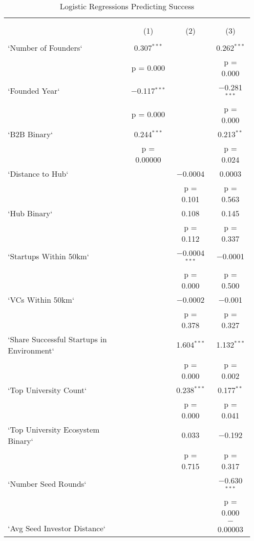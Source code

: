 
\begin{table}[!htbp] \centering 
  \caption{Logistic Regressions Predicting Success} 
  \label{} 
\tiny 
\begin{tabular}{@{\extracolsep{0pt}}lccc} 
\\[-1.8ex]\hline 
\hline \\[-1.8ex] 
\\[-1.8ex] & (1) & (2) & (3)\\ 
\hline \\[-1.8ex] 
 `Number of Founders` & 0.307$^{***}$ &  & 0.262$^{***}$ \\ 
  & p = 0.000 &  & p = 0.000 \\ 
  `Founded Year` & $-$0.117$^{***}$ &  & $-$0.281$^{***}$ \\ 
  & p = 0.000 &  & p = 0.000 \\ 
  `B2B Binary` & 0.244$^{***}$ &  & 0.213$^{**}$ \\ 
  & p = 0.00000 &  & p = 0.024 \\ 
  `Distance to Hub` &  & $-$0.0004 & 0.0003 \\ 
  &  & p = 0.101 & p = 0.563 \\ 
  `Hub Binary` &  & 0.108 & 0.145 \\ 
  &  & p = 0.112 & p = 0.337 \\ 
  `Startups Within 50km` &  & $-$0.0004$^{***}$ & $-$0.0001 \\ 
  &  & p = 0.000 & p = 0.500 \\ 
  `VCs Within 50km` &  & $-$0.0002 & $-$0.001 \\ 
  &  & p = 0.378 & p = 0.327 \\ 
  `Share Successful Startups in Environment` &  & 1.604$^{***}$ & 1.132$^{***}$ \\ 
  &  & p = 0.000 & p = 0.002 \\ 
  `Top University Count` &  & 0.238$^{***}$ & 0.177$^{**}$ \\ 
  &  & p = 0.000 & p = 0.041 \\ 
  `Top University Ecosystem Binary` &  & 0.033 & $-$0.192 \\ 
  &  & p = 0.715 & p = 0.317 \\ 
  `Number Seed Rounds` &  &  & $-$0.630$^{***}$ \\ 
  &  &  & p = 0.000 \\ 
  `Avg Seed Investor Distance` &  &  & $-$0.00003 \\ 

\end{tabular}
\end{table}
